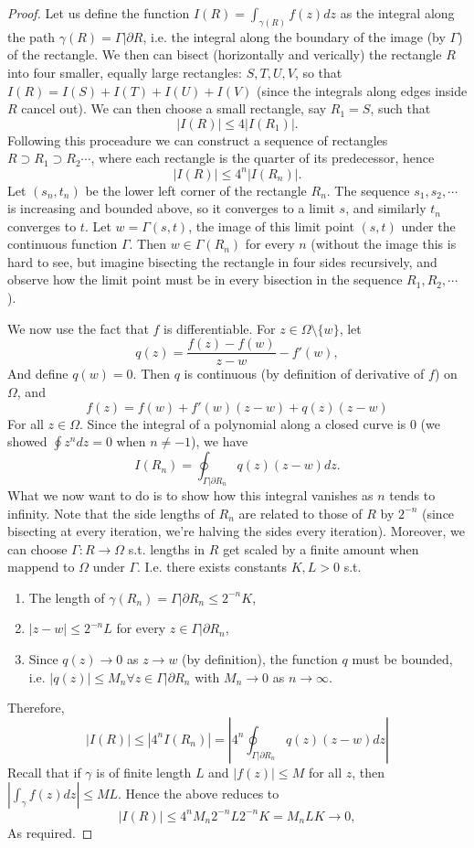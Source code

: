 \begin{proof}
  Let us define the function $I(R)=\int_{\gamma(R)}f(z)dz$ as the integral along
  the path $\gamma(R)=\Gamma|\partial R$, i.e. the integral along the boundary
  of the image (by $\Gamma$) of the rectangle. We then can bisect (horizontally
  and verically) the rectangle $R$ into four smaller, equally large rectangles:
  $S,T,U,V$, so that $I(R)=I(S)+I(T)+I(U)+I(V)$ (since the integrals along edges
  inside $R$ cancel out). We can then choose a small rectangle, say $R_1=S$,
  such that 
  \[|I(R)|\leq 4|I(R_1)|.\]
  Following this proceadure we can construct a sequence of rectangles $R\supset
  R_1 \supset R_2 \cdots$, where each rectangle is the quarter of its
  predecessor, hence 
  \[|I(R)| \leq 4^n |I(R_n)|.\]
  Let $(s_n,t_n)$ be the lower left corner of the rectangle $R_n$. The sequence
  $s_1,s_2,\cdots$ is increasing and bounded above, so it converges to a limit
  $s$, and similarly $t_n$ converges to $t$. Let $w=\Gamma(s,t)$, the image of
  this limit point $(s,t)$ under the continuous function $\Gamma$. Then $w\in
  \Gamma(R_n)$ for every $n$ (without the image this is hard to see, but imagine
    bisecting the rectangle in four sides recursively, and observe how the limit
  point must be in every bisection in the sequence $R_1,R_2,\cdots$ ).

  We now use the fact that $f$ is differentiable. For $z\in \Omega\setminus \{w\}$,
  let 
  \[q(z) = \frac{f(z)-f(w)}{z-w} - f'(w),\]
  And define $q(w)=0$. Then $q$ is continuous (by definition of derivative of
  $f$) on $\Omega$, and 
  \[f(z)=f(w)+f'(w)(z-w) + q(z)(z-w)\]
  For all $z\in\Omega$. Since the integral of a polynomial along a closed curve
  is $0$ (we showed $\oint z^n dz=0$ when $n\neq -1$), we have 
  \[I(R_n)= \oint_{\Gamma|\partial R_n} q(z)(z-w) dz.\]
  What we now want to do is to show how this integral vanishes as $n$ tends to
  infinity. Note that the side lengths of $R_n$ are related to those of $R$ by
  $2^{-n}$ (since bisecting at every iteration, we're halving the sides every
  iteration). Moreover, we can choose $\Gamma:R\to\Omega$ s.t. lengths in $R$
  get scaled by a finite amount when mappend to $\Omega$ under $\Gamma$. I.e.
  there exists constants $K,L>0$ s.t. 
  \begin{enumerate}
    \item The length of $\gamma(R_n)=\Gamma|\partial R_n \leq 2^{-n}K$,
    \item $|z-w|\leq 2^{-n}L$ for every $z\in \Gamma|\partial R_n$,
    \item Since $q(z)\to 0$ as $z\to w$ (by definition), the function $q$ must
      be bounded, i.e. $|q(z)|\leq M_n \forall z\in \Gamma|\partial R_n$ with
      $M_n\to 0$ as $n\to\infty$.
  \end{enumerate}
  Therefore,
  \[|I(R)|\leq |4^n I(R_n)| = |4^n \oint_{\Gamma|\partial R_n} q(z)(z-w) dz|\]
  Recall that if $\gamma$ is of finite length $L$ and $|f(z)|\leq M$ for all
  $z$, then $|\int_{\gamma} f(z)dz| \leq ML$. Hence the above reduces to 
  \[|I(R)|\leq 4^n M_n 2^{-n}L 2^{-n}K = M_nLK \to 0,\]
  As required.
\end{proof}


